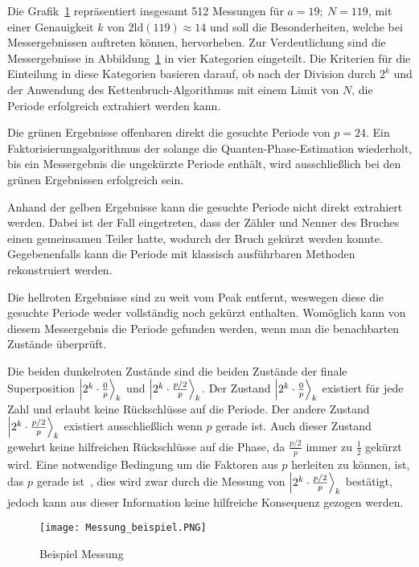\vspace{1em}

Die Grafik~\ref{fig:shor_measure} repräsentiert insgesamt 512 Messungen für \(a=19;~N=119\), 
mit einer Genauigkeit \(k\) von \(2\text{ld}(119) \approx 14 \) und soll die Besonderheiten, 
welche bei Messergebnissen auftreten können, hervorheben.
Zur Verdeutlichung sind die Messergebnisse in Abbildung~\ref{fig:shor_measure} in vier Kategorien eingeteilt.
Die Kriterien für die Einteilung in diese Kategorien basieren darauf, 
ob nach der Division durch \(2^k\) und 
der Anwendung des Kettenbruch-Algorithmus mit einem Limit von \(N\), 
die Periode erfolgreich extrahiert werden kann.

Die grünen Ergebnisse offenbaren direkt die gesuchte Periode von \(p = 24\).
Ein Faktorisierungsalgorithmus der solange die Quanten-Phase-Estimation wiederholt, 
bis ein Messergebnis die ungekürzte Periode enthält, 
wird ausschließlich bei den grünen Ergebnissen erfolgreich sein.

Anhand der gelben Ergebnisse kann die gesuchte Periode nicht direkt extrahiert werden.
Dabei ist der Fall eingetreten, dass der Zähler und Nenner des Bruches einen gemeinsamen Teiler hatte, 
wodurch der Bruch gekürzt werden konnte.
Gegebenenfalls kann die Periode mit klassisch ausführbaren Methoden rekonstruiert werden.

Die hellroten Ergebnisse sind zu weit vom Peak entfernt,
weswegen diese die gesuchte Periode weder vollständig noch gekürzt enthalten.
Womöglich kann von diesem Messergebnis die Periode gefunden werden, 
wenn man die benachbarten Zustände überprüft.

Die beiden dunkelroten Zustände sind die beiden Zustände der finale Superposition
\(\ket{2^k \cdot \frac{0}{p}}_k\) und \(\ket{2^k \cdot \frac{p/2}{p}}_k\).
Der Zustand \(\ket{2^k \cdot \frac{0}{p}}_k\) existiert für jede Zahl und erlaubt keine 
Rückschlüsse auf die Periode.
Der andere Zustand \(\ket{2^k \cdot \frac{p/2}{p}}_k\) existiert ausschließlich wenn \(p\) gerade ist.
Auch dieser Zustand gewehrt keine hilfreichen Rückschlüsse auf die Phase, 
da \(\frac{p/2}{p}\) immer zu \(\frac{1}{2}\) gekürzt wird.
Eine notwendige Bedingung um die Faktoren aus \(p\) herleiten zu können, 
ist, das \(p\) gerade ist~\cite*{Shor_1997}, 
dies wird zwar durch die Messung von \(\ket{2^k \cdot \frac{p/2}{p}}_k\) bestätigt, 
jedoch kann aus dieser Information keine hilfreiche Konsequenz gezogen werden.

\begin{figure} [H]
\caption{Beispiel Messung}
\label{fig:shor_measure}
\texttt{[image: Messung\_beispiel.PNG]}
\centering
\end{figure}

